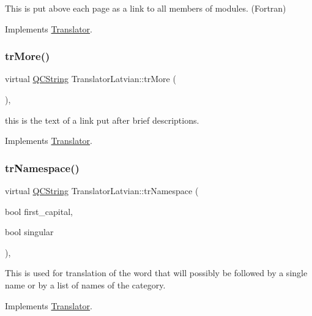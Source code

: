 This is put above each page as a link to all members of modules. (Fortran) 

Implements \mbox{\hyperlink{class_translator}{Translator}}.

\mbox{\label{class_translator_latvian_a3f517151b45640f3a7d4c95571f74e3b}} 
\subsubsection{\texorpdfstring{trMore()}{trMore()}}
{\footnotesize\ttfamily virtual \mbox{\hyperlink{class_q_c_string}{Q\+C\+String}} Translator\+Latvian\+::tr\+More (\begin{DoxyParamCaption}{ }\end{DoxyParamCaption})\hspace{0.3cm}{\ttfamily [inline]}, {\ttfamily [virtual]}}

this is the text of a link put after brief descriptions. 

Implements \mbox{\hyperlink{class_translator}{Translator}}.

\mbox{\label{class_translator_latvian_aeaacdfc872e76eb468a98ee4841a7337}} 
\subsubsection{\texorpdfstring{trNamespace()}{trNamespace()}}
{\footnotesize\ttfamily virtual \mbox{\hyperlink{class_q_c_string}{Q\+C\+String}} Translator\+Latvian\+::tr\+Namespace (\begin{DoxyParamCaption}\item[{bool}]{first\+\_\+capital,  }\item[{bool}]{singular }\end{DoxyParamCaption})\hspace{0.3cm}{\ttfamily [inline]}, {\ttfamily [virtual]}}

This is used for translation of the word that will possibly be followed by a single name or by a list of names of the category. 

Implements \mbox{\hyperlink{class_translator}{Translator}}.

\mbox{\label{class_translator_latvian_a0644f201c43e9f20a601b9d9d71df202}} 
